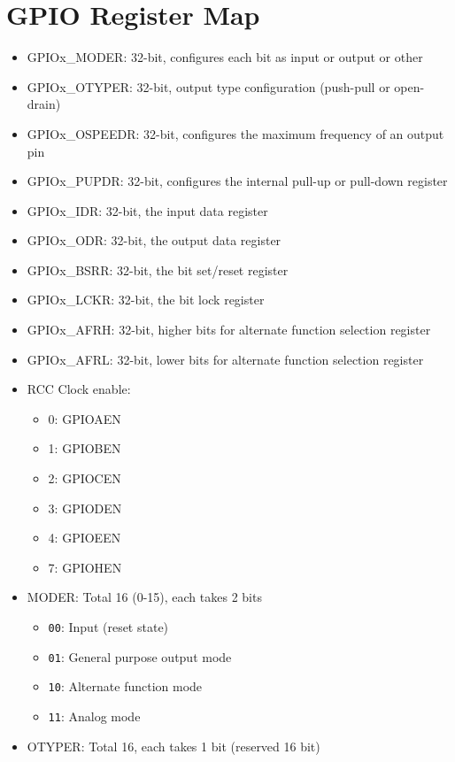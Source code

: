 \documentclass[a4paper,12pt,openany]{book}
\begin{document}
\section{GPIO Register Map}
\begin{itemize}
    \item GPIOx\_MODER: 32-bit, configures each bit as input or output or other
    \item GPIOx\_OTYPER: 32-bit, output type configuration (push-pull or open-drain)
    \item GPIOx\_OSPEEDR: 32-bit, configures the maximum frequency of an output pin
    \item GPIOx\_PUPDR: 32-bit, configures the internal pull-up or pull-down register
    \item GPIOx\_IDR: 32-bit, the input data register
    \item GPIOx\_ODR: 32-bit, the output data register
    \item GPIOx\_BSRR: 32-bit, the bit set/reset register
    \item GPIOx\_LCKR: 32-bit, the bit lock register
    \item GPIOx\_AFRH: 32-bit, higher bits for alternate function selection register
    \item GPIOx\_AFRL: 32-bit, lower bits for alternate function selection register
    \item RCC Clock enable:
    \begin{itemize}
        \item 0: GPIOAEN
        \item 1: GPIOBEN
        \item 2: GPIOCEN
        \item 3: GPIODEN
        \item 4: GPIOEEN
        \item 7: GPIOHEN
    \end{itemize}
    \item MODER: Total 16 (0-15), each takes 2 bits
    \begin{itemize}
        \item \texttt{00}: Input (reset state)
        \item \texttt{01}: General purpose output mode
        \item \texttt{10}: Alternate function mode
        \item \texttt{11}: Analog mode
    \end{itemize}
    \item OTYPER: Total 16, each takes 1 bit (reserved 16 bit)

\end{itemize}
\end{document}
